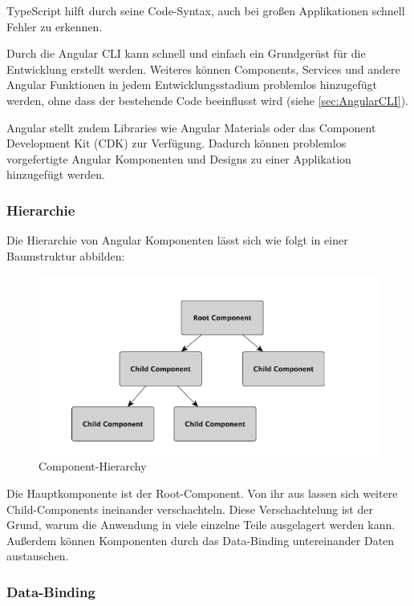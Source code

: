 TypeScript hilft durch seine Code-Syntax, auch bei großen Applikationen schnell Fehler zu erkennen. 

Durch die Angular CLI kann schnell und einfach ein Grundgerüst für die Entwicklung erstellt werden. Weiteres können Components, Services und andere Angular Funktionen in jedem Entwicklungsstadium problemlos hinzugefügt werden, ohne dass der bestehende Code beeinflusst wird (siehe \ref{sec:AngularCLI}).

Angular stellt zudem Libraries wie Angular Materials oder das Component Development Kit (CDK) zur Verfügung. Dadurch können problemlos vorgefertigte Angular Komponenten und Designs zu einer Applikation hinzugefügt werden.

\cite{AngularScaling}

\subsubsection{Hierarchie}
Die Hierarchie von Angular Komponenten lässt sich wie folgt in einer Baumstruktur abbilden:

\begin{figure}
    \centering
    \includegraphics[scale=0.6]{pics/hierarchy.PNG}
    \caption{Component-Hierarchy \cite{AngularBuch}}
    \label{fig:tech:front:component-hierarchy}
  \end{figure}
Die Hauptkomponente ist der Root-Component. Von ihr aus lassen sich weitere Child-Components ineinander verschachteln. Diese Verschachtelung ist der Grund, warum die Anwendung in viele einzelne Teile ausgelagert werden kann. Außerdem können Komponenten durch das Data-Binding untereinander Daten austauschen.

\cite{AngularComponentsHierarche} \cite{AngularBuch}

\subsubsection{Data-Binding }
\label{data-binding}

